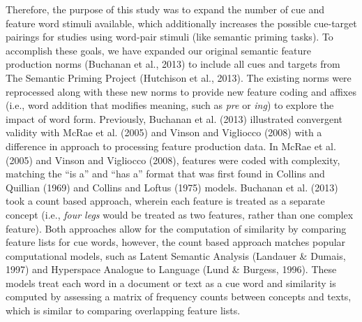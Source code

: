 \documentclass[english,,man]{apa6}
\begin{document}
Therefore, the purpose of this study was to expand the number of cue and feature word stimuli available, which additionally increases the possible cue-target pairings for studies using word-pair stimuli (like semantic priming tasks). To accomplish these goals, we have expanded our original semantic feature production norms (Buchanan et al., 2013) to include all cues and targets from The Semantic Priming Project (Hutchison et al., 2013). The existing norms were reprocessed along with these new norms to provide new feature coding and affixes (i.e., word addition that modifies meaning, such as \emph{pre} or \emph{ing}) to explore the impact of word form. Previously, Buchanan et al. (2013) illustrated convergent validity with McRae et al. (2005) and Vinson and Vigliocco (2008) with a difference in approach to processing feature production data. In McRae et al. (2005) and Vinson and Vigliocco (2008), features were coded with complexity, matching the \enquote{is a} and \enquote{has a} format that was first found in Collins and Quillian (1969) and Collins and Loftus (1975) models. Buchanan et al. (2013) took a count based approach, wherein each feature is treated as a separate concept (i.e., \emph{four legs} would be treated as two features, rather than one complex feature). Both approaches allow for the computation of similarity by comparing feature lists for cue words, however, the count based approach matches popular computational models, such as Latent Semantic Analysis (Landauer \& Dumais, 1997) and Hyperspace Analogue to Language (Lund \& Burgess, 1996). These models treat each word in a document or text as a cue word and similarity is computed by assessing a matrix of frequency counts between concepts and texts, which is similar to comparing overlapping feature lists.
\end{document}
